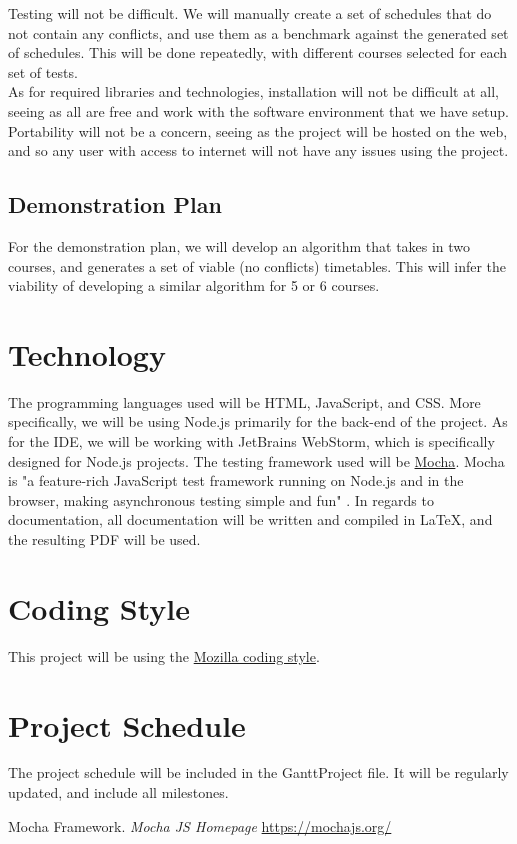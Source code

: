 \documentclass[12pt]{article}
\begin{document}
Testing will not be difficult. We will manually create a set of schedules that do not contain any conflicts, and use them as a benchmark against the generated set of schedules. This will be done repeatedly, with different courses selected for each set of tests. \\

As for required libraries and technologies, installation will not be difficult at all, seeing as all are free and work with the software environment that we have setup. Portability will not be a concern, seeing as the project will be hosted on the web, and so any user with access to internet will not have any issues using the project.

\newpage
\subsection{Demonstration Plan}
For the demonstration plan, we will develop an algorithm that takes in two courses, and generates a set of viable (no conflicts) timetables. This will infer the viability of developing a similar algorithm for 5 or 6 courses.
\section{Technology}
The programming languages used will be HTML, JavaScript, and CSS. More specifically, we will be using Node.js primarily for the back-end of the project. As for the IDE, we will be working with JetBrains WebStorm, which is specifically designed for Node.js projects. The testing framework used will be \href{https://mochajs.org/}{Mocha}. Mocha is "a feature-rich JavaScript test framework running on Node.js and in the browser, making asynchronous testing simple and fun" \cite{1}. In regards to documentation, all documentation will be written and compiled in \LaTeX , and the resulting PDF will be used.
\section{Coding Style}
This project will be using the \href{https://developer.mozilla.org/en-US/docs/Mozilla/Developer_guide/Coding_Style}{Mozilla coding style}.
\section{Project Schedule}
The project schedule will be included in the GanttProject file. It will be regularly updated, and include all milestones. 



\begin{thebibliography}{9}
Mocha Framework.
\textit{Mocha JS Homepage}
\url{https://mochajs.org/}


 
\end{thebibliography}
\end{document}
